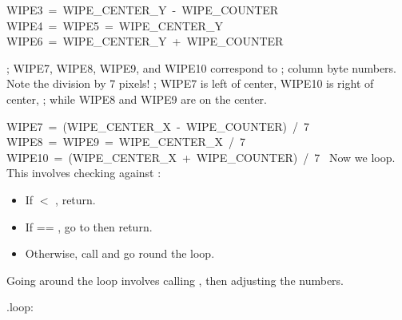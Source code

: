 \documentclass[10pt]{report}%
\begin{document}
\LA{}\code{}WIPE3\ =\ WIPE{\_}CENTER{\_}Y\ -\ WIPE{\_}COUNTER\edoc{}~{\nwtagstyle{}}\RA{}
\LA{}\code{}WIPE4\ =\ WIPE5\ =\ WIPE{\_}CENTER{\_}Y\edoc{}~{\nwtagstyle{}}\RA{}
\LA{}\code{}WIPE6\ =\ WIPE{\_}CENTER{\_}Y\ +\ WIPE{\_}COUNTER\edoc{}~{\nwtagstyle{}}\RA{}

; WIPE7, WIPE8, WIPE9, and WIPE10 correspond to
; column byte numbers. Note the division by 7 pixels!
; WIPE7 is left of center, WIPE10 is right of center,
; while WIPE8 and WIPE9 are on the center.

\LA{}\code{}WIPE7\ =\ (WIPE{\_}CENTER{\_}X\ -\ WIPE{\_}COUNTER)\ /\ 7\edoc{}~{\nwtagstyle{}}\RA{}
\LA{}\code{}WIPE8\ =\ WIPE9\ =\ WIPE{\_}CENTER{\_}X\ /\ 7\edoc{}~{\nwtagstyle{}}\RA{}
\LA{}\code{}WIPE10\ =\ (WIPE{\_}CENTER{\_}X\ +\ WIPE{\_}COUNTER)\ /\ 7\edoc{}~{\nwtagstyle{}}\RA{}
\eatline
{}\nwendcode{}\nwdocspar
Now we loop. This involves checking {\Tt{}\nwendquote} against {\Tt{}\nwendquote}:

\begin{itemize}
  \item If {\Tt{}\nwendquote} $<$ {\Tt{}\nwendquote}, return.
  \item If {\Tt{}\nwendquote} == {\Tt{}\nwendquote}, go to {\Tt{}\nwendquote} then return.
  \item Otherwise, call {\Tt{}\nwendquote} and go round the loop.
\end{itemize}

Going around the loop involves calling {\Tt{}\nwendquote}, then adjusting
the numbers.

\nwenddocs{}\plusendmoddef\nwstartdeflinemarkup{}\nwenddeflinemarkup
.loop:
\end{document}
